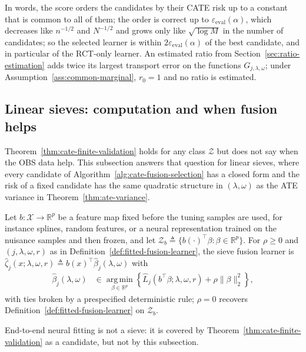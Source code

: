In words, the score orders the candidates by their CATE risk up to a constant that is common to all of them; the order is correct up to $\varepsilon_{\mathrm{eval}}(\alpha)$, which decreases like $n^{-1/2}$ and $N^{-1/2}$ and grows only like $\sqrt{\log M}$ in the number of candidates; so the selected learner is within $2\varepsilon_{\mathrm{eval}}(\alpha)$ of the best candidate, and in particular of the RCT-only learner. An estimated ratio from Section~\ref{sec:ratio-estimation} adds twice its largest transport error on the functions $G_{j,\lambda,\omega}$; under Assumption~\ref{ass:common-marginal}, $r_0=1$ and no ratio is estimated.

\subsection{Linear sieves: computation and when fusion helps}
\label{sec:cate-sieve}


Theorem~\ref{thm:cate-finite-validation} holds for any class $\mathcal Z$ but does not say when the OBS data help. This subsection answers that question for linear sieves, where every candidate of Algorithm~\ref{alg:cate-fusion-selection} has a closed form and the risk of a fixed candidate has the same quadratic structure in $(\lambda,\omega)$ as the ATE variance in Theorem~\ref{thm:ate-variance}.

\begin{definition}
\label{def:linear-sieve-fusion-learner}
Let $b:\mathcal X\to\mathbb R^p$ be a feature map fixed before the tuning samples are used, for instance splines, random features, or a neural representation trained on the nuisance samples and then frozen, and let $\mathcal Z_b\triangleq\{b(\cdot)^\top\beta:\beta\in\mathbb R^p\}$. For $\rho\geq0$ and $(j,\lambda,\omega,r)$ as in Definition~\ref{def:fitted-fusion-learner}, the sieve fusion learner is $\widehat\zeta_j(x;\lambda,\omega,r)\triangleq b(x)^\top\widehat\beta_j(\lambda,\omega)$ with
\begin{align}
\widehat\beta_j(\lambda,\omega)
&\in\operatorname*{arg\,min}_{\beta\in\mathbb R^p}\left\{\widehat L_j(b^\top\beta;\lambda,\omega,r)+\rho\|\beta\|_2^2\right\},
\label{eq:sieve-learner}
\end{align}
with ties broken by a prespecified deterministic rule; $\rho=0$ recovers Definition~\ref{def:fitted-fusion-learner} on $\mathcal Z_b$.
\end{definition}
End-to-end neural fitting is not a sieve: it is covered by Theorem~\ref{thm:cate-finite-validation} as a candidate, but not by this subsection.

